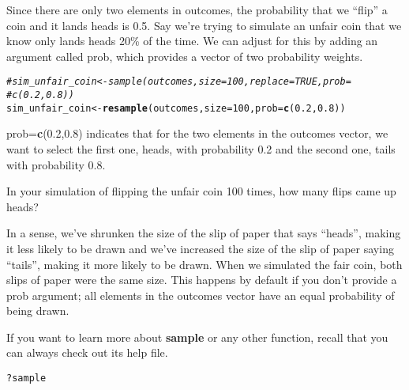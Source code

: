 \documentclass{article}\usepackage[]{graphicx}\usepackage[]{color}
\makeatletter
\newcommand{\hlnum}[1]{\textcolor[rgb]{0.686,0.059,0.569}{#1}}%
\newcommand{\hlstr}[1]{\textcolor[rgb]{0.192,0.494,0.8}{#1}}%
\newcommand{\hlcom}[1]{\textcolor[rgb]{0.678,0.584,0.686}{\textit{#1}}}%
\newcommand{\hlopt}[1]{\textcolor[rgb]{0,0,0}{#1}}%
\newcommand{\hlstd}[1]{\textcolor[rgb]{0.345,0.345,0.345}{#1}}%
\newcommand{\hlkwb}[1]{\textcolor[rgb]{0.69,0.353,0.396}{#1}}%
\newcommand{\hlkwc}[1]{\textcolor[rgb]{0.333,0.667,0.333}{#1}}%
\newcommand{\hlkwd}[1]{\textcolor[rgb]{0.737,0.353,0.396}{\textbf{#1}}}%
\newenvironment{kframe}{%
 \def\at@end@of@kframe{}%
 \ifinner\ifhmode%
  \def\at@end@of@kframe{\end{minipage}}%
  \begin{minipage}{\columnwidth}%
 \fi\fi%
 \def\FrameCommand##1{\hskip\@totalleftmargin \hskip-\fboxsep
 \colorbox{shadecolor}{##1}\hskip-\fboxsep
     \hskip-\linewidth \hskip-\@totalleftmargin \hskip\columnwidth}%
 \MakeFramed {\advance\hsize-\width
   \@totalleftmargin\z@ \linewidth\hsize
   \@setminipage}}%
 {\par\unskip\endMakeFramed%
 \at@end@of@kframe}
\newenvironment{knitrout}{}{} %
\makeatother
\begin{document}
Since there are only two elements in \hlstd{outcomes}, the probability that we ``flip'' a coin and it lands heads is 0.5. Say we're trying to simulate an unfair coin that we know only lands heads 20\% of the time. We can adjust for this by adding an argument called \hlkwc{prob}, which provides a vector of two probability weights.

\begin{knitrout}
\color{fgcolor}\begin{kframe}
\begin{alltt}
\hlcom{# sim_unfair_coin <- sample(outcomes, size = 100, replace = TRUE, prob =}
\hlcom{# c(0.2, 0.8))}
\hlstd{sim_unfair_coin} \hlkwb{<-} \hlkwd{resample}\hlstd{(outcomes,} \hlkwc{size} \hlstd{=} \hlnum{100}\hlstd{,} \hlkwc{prob} \hlstd{=} \hlkwd{c}\hlstd{(}\hlnum{0.2}\hlstd{,} \hlnum{0.8}\hlstd{))}
\end{alltt}
\end{kframe}
\end{knitrout}


\hlkwc{prob}\hlkwc{=}\hlkwd{c}\hlnum{(0.2,0.8)} indicates that for the two elements in the \hlstd{outcomes} vector, we want to select the first one, \hlstr{heads}, with probability 0.2 and the second one, \hlstr{tails} with probability 0.8.

\begin{exercise}
In your simulation of flipping the unfair coin 100 times, how many flips came up heads?
\end{exercise}

In a sense, we've shrunken the size of the slip of paper that says ``heads'', making it less likely to be drawn and we've increased the size of the slip of paper saying ``tails'', making it more likely to be drawn. When we simulated the fair coin, both slips of paper were the same size. This happens by default if you don't provide a \hlkwc{prob} argument; all elements in the \hlstd{outcomes} vector have an equal probability of being drawn.

If you want to learn more about \hlkwd{sample} or any other function, recall that you can always check out its help file.

\begin{knitrout}
\color{fgcolor}\begin{kframe}
\begin{alltt}
\hlopt{?}\hlstd{sample}
\end{alltt}
\end{kframe}
\end{knitrout}
\end{document}
